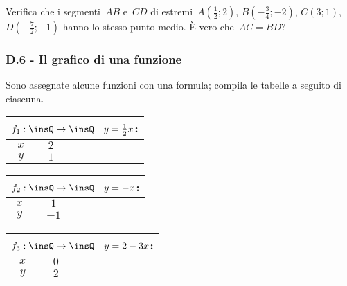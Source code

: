 \begin{esercizio}
\label{ese:D.36}
Verifica che i segmenti~${AB}$ e~${CD}$ di estremi~$A\left(\frac{1}{2};2\right)$, $B\left(-{\frac{3}{4}};-2\right)$, $C(3;1)$,
$D\left(-{\frac{7}{2}};-1\right)$ hanno lo stesso punto medio. È vero che~${AC}={BD}$?
\end{esercizio}

\subsubsection*{D.6 - Il grafico di una funzione}

\begin{esercizio}
\label{ese:D.37}
Sono assegnate alcune funzioni con una formula; compila le tabelle a seguito di ciascuna.
\begin{multicols}{3}
 \begin{center}
 \begin{tabular}{cccccc}
 \multicolumn{6}{c}{$f_1:\insQ \rightarrow \insQ\quad y=\frac{1}{2}x$:}\\
 \toprule
  $x$ & $2$& & & &\\
  $y$ & $1$& & & & \\
\bottomrule
 \end{tabular}
 \end{center}

\begin{center}
 \begin{tabular}{cccccc}
 \multicolumn{6}{c}{ $f_2:\insQ \rightarrow \insQ\quad y=-x$:}\\
\toprule
$x$ & $1$& & & &\\
$y$ & $-1$& & & & \\
\bottomrule
 \end{tabular}
\end{center}

 \begin{center}
 \begin{tabular}{cccccc}
 \multicolumn{6}{c}{ $f_3:\insQ \rightarrow \insQ\quad y=2-3x$:}\\
\toprule
$x$ & $0$& & & &\\
$y$ & $2$& & & & \\
\bottomrule
 \end{tabular}
 \end{center}
\end{multicols}
\end{esercizio}

\pagebreak

